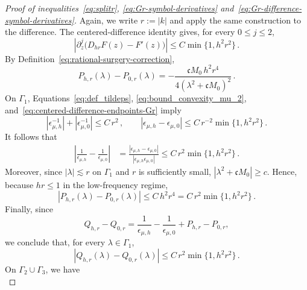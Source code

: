 \documentclass[a4paper,12pt]{amsart} %
\theoremstyle{plain}
\theoremstyle{definition}
\newcommand		{\lt}			{\left}				%
\newcommand		{\rt}			{\right}			%
\renewcommand	{\(}			{\lt(}
\renewcommand	{\)}			{\rt)}
\newcommand		{\n}[1]			{\lt\lvert{#1}\rt\rvert}	%
\newcommand	{\h}			{h}
\newcommand		{\CK}			{\mathfrak{c}}	%
\begin{document}
	\begin{proof}[Proof of inequalities~\eqref{eq:splitr}, \eqref{eq:Gr-symbol-derivatives} and~\eqref{eq:Gr-difference-symbol-derivatives}]
		Again, we write $r:=\n{k}$ and apply the same construction to the difference. The centered-difference identity gives, for every $0\leq j\leq2$,
		\begin{equation}\label{eq:centered-difference-endpoints-Gr}
			\n{\partial_z^j\bigl(D_{hr}F(z)-F'(z)\bigr)} \leq C\min\{1,h^2r^2\} \, .
		\end{equation}
		By Definition~\eqref{eq:rational-surgery-correction},
		\begin{equation}\label{eq:difference-rational-correction}
			P_{\h,r}(\lambda)-P_{0,r}(\lambda) = -\frac{\CK M_0 \, h^2r^4}{4\lt(\lambda^2+\CK M_0\rt)^2} \, .
		\end{equation}
		On $\Gamma_1$, Equations~\eqref{eq:def_tildeps}, \eqref{eq:bound_convexity_mu_2}, and~\eqref{eq:centered-difference-endpoints-Gr} imply
		\begin{equation*}
			\n{\epsilon_{\mu,\h}^{-1}} + \n{\epsilon_{\mu,0}^{-1}} \leq C \, r^2 \, ,
			\qquad
			\n{\epsilon_{\mu,\h}-\epsilon_{\mu,0}} \leq C \, r^{-2} \min\{1,h^2r^2\} \, .
		\end{equation*}
		It follows that
		\begin{align*}
			\n{\frac{1}{\epsilon_{\mu,\h}}-\frac{1}{\epsilon_{\mu,0}}}
			&=\frac{\n{\epsilon_{\mu,\h}-\epsilon_{\mu,0}}}{\n{\epsilon_{\mu,\h}\epsilon_{\mu,0}}}\leq C \, r^2 \min\{1,h^2r^2\} \, .
		\end{align*}
		Moreover, since $\n{\lambda}\lesssim r$ on $\Gamma_1$ and $r$ is sufficiently small, $\n{\lambda^2+\CK M_0}\geq c$. Hence, because $hr\leq1$ in the low-frequency regime,
		\begin{equation*}
			\n{P_{\h,r}(\lambda)-P_{0,r}(\lambda)} \leq C \, h^2r^4 = C \, r^2\min\{1,h^2r^2\} \, .
		\end{equation*}
		Finally, since
		\begin{equation*}
			Q_{\h,r}-Q_{0,r} =\frac{1}{\epsilon_{\mu,\h}} - \frac{1}{\epsilon_{\mu,0}} + P_{\h,r}-P_{0,r},
		\end{equation*}
		we conclude that, for every $\lambda\in\Gamma_1$,
		\begin{equation}\label{eq:difference-post-residue-central-bound}
			\n{Q_{\h,r}(\lambda)-Q_{0,r}(\lambda)} \leq C \, r^2 \min\{1,h^2r^2\} \, .
		\end{equation}
		On $\Gamma_2\cup\Gamma_3$, we have
		\begin{equation*}

\end{equation*}
\end{proof}
\end{document}

